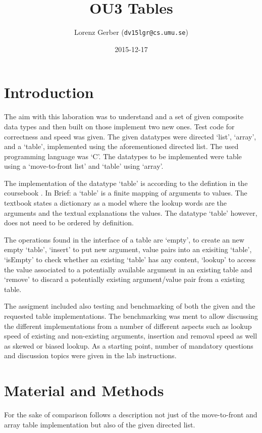 \documentclass[a4paper,11pt,twoside]{article}
\title{OU3 Tables}
\author{Lorenz Gerber  ({\tt{dv15lgr@cs.umu.se}})}
\date{2015-12-17}
\begin{document}
\maketitle

\tableofcontents
\newpage

\section{Introduction} 
The aim with this laboration was to understand and a set of given 
composite data types and then built on those implement two new ones.
Test code for correctness and speed was given. The given datatypes
were directed `list', `array', and a `table', implemented using the 
aforementioned directed list. The used programming language was `C'. 
The datatypes to be implemented were table using a `move-to-front 
list' and `table' using `array'.

The implementation of the datatype `table' is according to the 
defintion in the coursebook \cite[po. 117 -- 132]{janlert2000}. In Brief:
a `table' is a finite mapping of arguments to values. The textbook states 
a dictionary as a model where the lookup words are the arguments and the
textual explanations the values. The datatype `table' however, does not 
need to be ordered by definition.

The operations found in the interface of a table are `empty', to create
an new empty `table', `insert' to put new argument, value pairs into an 
exisiting `table', `isEmpty' to check whether an existing `table' has any
content, `lookup' to access the value associated to a potentially available
argument in an existing table and `remove' to discard a potentially
existing argument/value pair from a existing table.  

The assigment included also testing and benchmarking of both the given and
the requested table implementations. The benchmarking was ment to
allow discussing the different implementations from a number of different
aspects such as lookup speed of existing and non-existing arguments, insertion
and removal speed as well as skewed or biased lookup. As a starting point,
number of mandatory questions and discussion topics were given in the
lab instructions.  

\section{Material and Methods} 
For the sake of comparison follows a description not just of the move-to-front
and array table implementation but also of the given directed list. 
\end{document}
